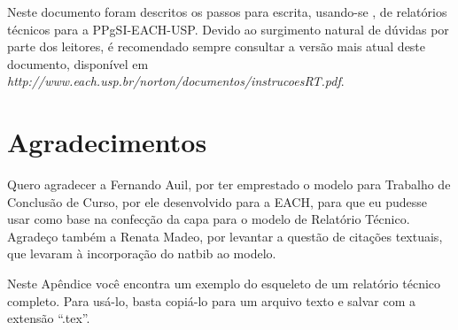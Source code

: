 \documentclass[12pt,a4paper,utf8]{ppgsi}
\begin{document}
	Neste documento foram descritos os passos para escrita, usando-se \LaTeXe{}, de relatórios técnicos para a PPgSI-EACH-USP. Devido ao surgimento natural de dúvidas por parte dos leitores, é recomendado sempre consultar a versão mais atual deste documento, disponível em \textit{http://www.each.usp.br/norton/documentos/instrucoesRT.pdf}.

	
\section*{Agradecimentos}

	Quero agradecer a Fernando Auil, por ter emprestado o modelo para Trabalho de Conclusão de Curso, por ele desenvolvido para a EACH, para que eu pudesse usar como base na confecção da capa para o modelo de Relatório Técnico. Agradeço também a Renata Madeo, por levantar a questão de citações textuais, que levaram à incorporação do natbib ao modelo.
	
	



\appendix

\label{ap:exemplo}

	Neste Apêndice você encontra um exemplo do esqueleto de um relatório técnico completo. Para usá-lo, basta copiá-lo para um arquivo texto e salvar com a extensão ``.tex''.
\end{document}

